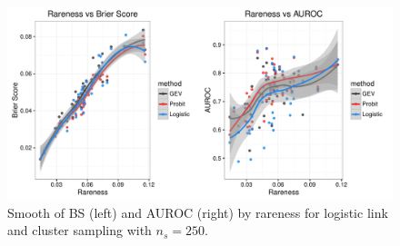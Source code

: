 \begin{figure} %
	\includegraphics[width=\linewidth]{plots/byrareness-7}
	\caption{Smooth of BS (left) and AUROC (right) by rareness for logistic link and cluster sampling with $n_s = 250$.}
	\label{rbfig:simsmooth-logclu250}
\end{figure}




